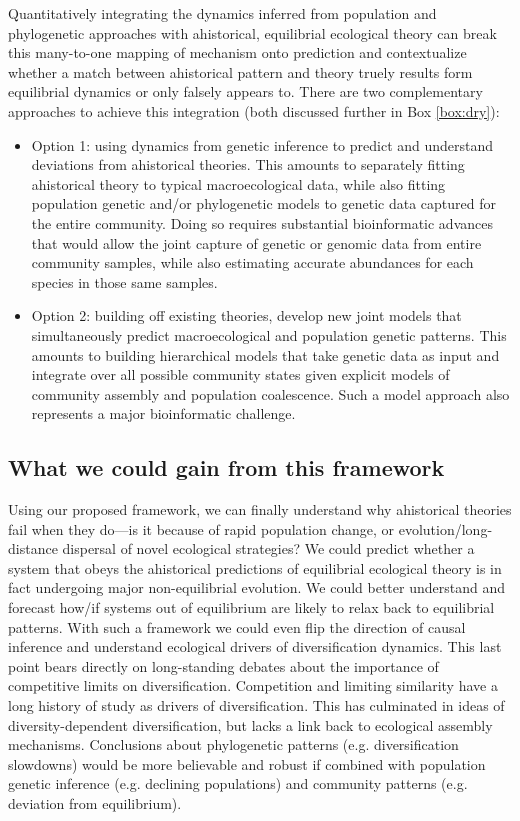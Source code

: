 \documentclass[12pt]{article}
\newcounter{Box}
\begin{document}
Quantitatively integrating the dynamics inferred from population and
phylogenetic approaches with ahistorical, equilibrial ecological
theory can break this many-to-one mapping of mechanism onto prediction
and contextualize whether a match between ahistorical pattern and
theory truely results form equilibrial dynamics or only falsely
appears to. There are two complementary approaches to achieve this
integration (both discussed further in Box \ref{box:dry}):

\begin{itemize}
\item Option 1: using dynamics from genetic inference to predict and
  understand deviations from ahistorical theories. This amounts to
  separately fitting ahistorical theory to typical macroecological
  data, while also fitting population genetic and/or phylogenetic
  models to genetic data captured for the entire community. Doing so
  requires substantial bioinformatic advances that would allow the
  joint capture of genetic or genomic data from entire community
  samples, while also estimating accurate abundances for each species
  in those same samples.
\item Option 2: building off existing theories, develop new joint
  models that simultaneously predict macroecological and population
  genetic patterns. This amounts to building hierarchical models that
  take genetic data as input and integrate over all possible community
  states given explicit models of community assembly and population
  coalescence. Such a model approach also represents a major
  bioinformatic challenge.
\end{itemize}

\subsection{What we could gain from this framework}

Using our proposed framework, we can finally understand why
ahistorical theories fail when they do---is it because of rapid
population change, or evolution/long-distance dispersal of novel
ecological strategies? We could predict whether a system that obeys
the ahistorical predictions of equilibrial ecological theory is in
fact undergoing major non-equilibrial evolution. We could better
understand and forecast how/if systems out of equilibrium are likely
to relax back to equilibrial patterns. With such a framework we could
even flip the direction of causal inference and understand ecological
drivers of diversification dynamics. This last point bears directly on
long-standing debates about the importance of competitive limits on
diversification. Competition and limiting similarity have a long
history of study as drivers of diversification. This has culminated in
ideas of diversity-dependent diversification\citep{rabosky2009}, but
lacks a link back to ecological assembly mechanisms. Conclusions about
phylogenetic patterns (e.g. diversification slowdowns) would be more
believable and robust if combined with population genetic inference
(e.g. declining populations) and community patterns (e.g.  deviation
from equilibrium).
\end{document}
